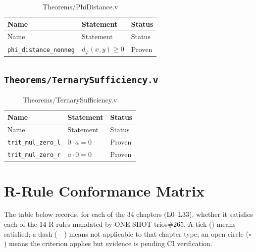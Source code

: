 \begin{longtable}{lll}
\toprule
Name & Statement & Status \\
\midrule
\endfirsthead
\toprule
Name & Statement & Status \\
\midrule
\endhead
\bottomrule
\endfoot
\bottomrule
\caption{Theorems/PhiDistance.v}
\endlastfoot
\texttt{phi\_distance\_nonneg} &
  $d_{\varphi}(x,y)\geq 0$ & Proven \\
\end{longtable}

\subsection{\texttt{Theorems/TernarySufficiency.v}}
\label{sec:A-coq-ternary}

\begin{longtable}{lll}
\toprule
Name & Statement & Status \\
\midrule
\endfirsthead
\toprule
Name & Statement & Status \\
\midrule
\endhead
\bottomrule
\endfoot
\bottomrule
\caption{Theorems/TernarySufficiency.v}
\endlastfoot
\texttt{trit\_mul\_zero\_l} & $0\cdot a=0$ & Proven \\
\texttt{trit\_mul\_zero\_r} & $a\cdot 0=0$ & Proven \\
\end{longtable}

\section{R-Rule Conformance Matrix}
\label{sec:A-rrule-matrix}

The table below records, for each of the 34 chapters (L0–L33), whether
it satisfies each of the 14 R-rules mandated by ONE-SHOT trios\#265.
A tick (\checkmark) means satisfied; a dash (---) means not applicable
to that chapter type; an open circle ($\circ$) means the criterion
applies but evidence is pending CI verification.

